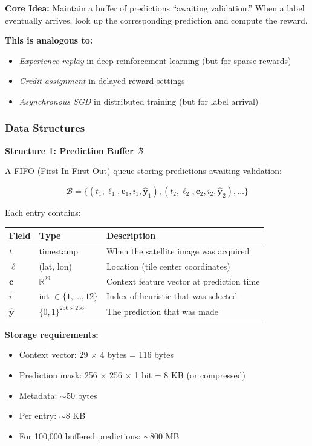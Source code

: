 \documentclass[11pt]{article}
\begin{document}
\textbf{Core Idea:} Maintain a buffer of predictions ``awaiting validation.'' When a label eventually arrives, look up the corresponding prediction and compute the reward.

\textbf{This is analogous to:}
\begin{itemize}
    \item \textit{Experience replay} in deep reinforcement learning (but for sparse rewards)
    \item \textit{Credit assignment} in delayed reward settings
    \item \textit{Asynchronous SGD} in distributed training (but for label arrival)
\end{itemize}

\subsubsection{Data Structures}

\textbf{Structure 1: Prediction Buffer $\mathcal{B}$}

A FIFO (First-In-First-Out) queue storing predictions awaiting validation:

\[
\mathcal{B} = \{(t_1, \ell_1, \mathbf{c}_1, i_1, \hat{\mathbf{y}}_1), (t_2, \ell_2, \mathbf{c}_2, i_2, \hat{\mathbf{y}}_2), \ldots\}
\]

Each entry contains:
\begin{center}
\begin{tabular}{lll}
\toprule
\textbf{Field} & \textbf{Type} & \textbf{Description} \\
\midrule
$t$ & timestamp & When the satellite image was acquired \\
$\ell$ & (lat, lon) & Location (tile center coordinates) \\
$\mathbf{c}$ & $\mathbb{R}^{29}$ & Context feature vector at prediction time \\
$i$ & int $\in \{1, \ldots, 12\}$ & Index of heuristic that was selected \\
$\hat{\mathbf{y}}$ & $\{0,1\}^{256 \times 256}$ & The prediction that was made \\
\bottomrule
\end{tabular}
\end{center}

\textbf{Storage requirements:}
\begin{itemize}
    \item Context vector: 29 $\times$ 4 bytes = 116 bytes
    \item Prediction mask: 256 $\times$ 256 $\times$ 1 bit = 8 KB (or compressed)
    \item Metadata: $\sim$50 bytes
    \item Per entry: $\sim$8 KB
    \item For 100,000 buffered predictions: $\sim$800 MB
\end{itemize}
\end{document}

